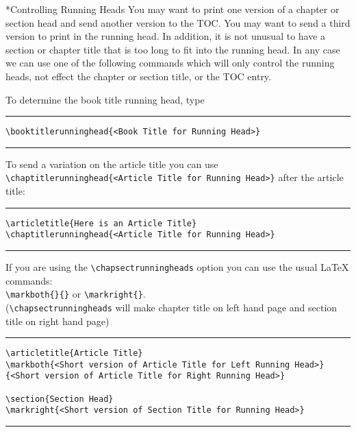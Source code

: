\documentclass{kapproc} %
\makeatletter
\newif\ifdotoc
\def\numberline#1{}
\def\ysection#1{\ifdotoc
\addcontentsline{toc}{section}{\protect\numberline{x}#1}\fi
{\let\uppercase\relax
\@startsection {section}{3}{-24pt}{-36pt plus -1pt minus 
 -1pt}{1sp}{\Large\bf}*{#1}}}
\def\section{\ysection}
\makeatother
\begin{document}
\section{Controlling Running Heads}
You may want to print one version of a chapter or section
head and send another version to the TOC. You may want
to send a third version to print in the running head.
In addition,
it is not unusual to have a section or chapter title that
is too long to fit into the running head. 
In any case we can use one of the following
commands which will only control the running heads, not
effect the chapter or section title, or the TOC entry.

To determine the book title running head, type\\
\hrule
\verb+\booktitlerunninghead{<Book Title for Running Head>}+
\vskip3pt
\hrule
\vskip6pt
To send a variation on the article title you can use\\
\verb+\chaptitlerunninghead{<Article Title for Running Head>}+
after the article title:
\vskip6pt
\hrule
\begin{verbatim}
\articletitle{Here is an Article Title}
\chaptitlerunninghead{<Article Title for Running Head>}
\end{verbatim}
\hrule
\vskip6pt

If you are using the \verb+\chapsectrunningheads+ option you
can use the usual LaTeX commands:\\ \verb+\markboth{}{}+ or
\verb+\markright{}+.\\
(\verb+\chapsectrunningheads+ will make chapter title on left hand page
  and section title on right hand page)
\vskip6pt
\hrule
\begin{verbatim}
\articletitle{Article Title}
\markboth{<Short version of Article Title for Left Running Head>}
{<Short version of Article Title for Right Running Head>}

\section{Section Head}
\markright{<Short version of Section Title for Running Head>}
\end{verbatim}
\hrule
\eject
\end{document}

